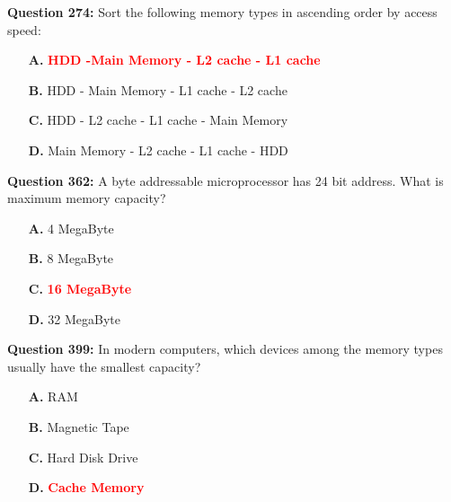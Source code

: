 \documentclass[12pt,a4paper]{article}
\begin{document}
\vspace{0.5cm}

\vspace{0.5cm}

\textbf{Question 274:} Sort the following memory types in ascending order by access speed:

\begin{itemize}
    \item[\textbf{A.}] \textcolor{red}{\textbf{HDD -Main Memory - L2 cache - L1 cache}}
    \item[\textbf{B.}] HDD - Main Memory - L1 cache - L2 cache
    \item[\textbf{C.}] HDD - L2 cache - L1 cache - Main Memory
    \item[\textbf{D.}] Main Memory - L2 cache - L1 cache - HDD
\end{itemize}

\vspace{0.5cm}

\vspace{0.5cm}

\textbf{Question 362:} A byte addressable microprocessor has 24 bit address. What is maximum memory capacity?

\begin{itemize}
    \item[\textbf{A.}] 4 MegaByte
    \item[\textbf{B.}] 8 MegaByte
    \item[\textbf{C.}] \textcolor{red}{\textbf{16 MegaByte}}
    \item[\textbf{D.}] 32 MegaByte
\end{itemize}

\vspace{0.5cm}

\vspace{0.5cm}

\textbf{Question 399:} In modern computers, which devices among the memory types usually have the smallest capacity?

\begin{itemize}
    \item[\textbf{A.}] RAM
    \item[\textbf{B.}] Magnetic Tape
    \item[\textbf{C.}] Hard Disk Drive
    \item[\textbf{D.}] \textcolor{red}{\textbf{Cache Memory}}
\end{itemize}

\vspace{0.5cm}
\end{document}
